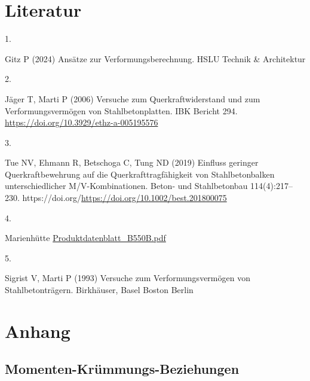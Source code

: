\documentclass[
  11pt,
  letterpaper,
]{scrreprt}
\newlength{\cslhangindent}
\newlength{\csllabelwidth}
\newenvironment{CSLReferences}[2] %
 {\begin{list}{}{%
  \setlength{\itemindent}{0pt}
  \setlength{\leftmargin}{0pt}
  \setlength{\parsep}{0pt}
  \ifodd #1
   \setlength{\leftmargin}{\cslhangindent}
   \setlength{\itemindent}{-1\cslhangindent}
  \fi
  \setlength{\itemsep}{#2\baselineskip}}}
 {\end{list}}
\newcommand{\CSLLeftMargin}[1]{\parbox[t]{\csllabelwidth}{\strut#1\strut}}
\newcommand{\CSLRightInline}[1]{\parbox[t]{\linewidth - \csllabelwidth}{\strut#1\strut}}
\begin{document}
\chapter*{Literatur}\label{literatur}


\label{refs}
\begin{CSLReferences}{0}{1}
\CSLLeftMargin{1. }%
\CSLRightInline{Gitz P (2024) Ansätze zur {Verformungsberechnung}. HSLU
Technik \& Architektur}

\CSLLeftMargin{2. }%
\CSLRightInline{Jäger T, Marti P (2006) Versuche zum
{Querkraftwiderstand} und zum {Verformungsvermögen} von
{Stahlbetonplatten}. IBK Bericht 294.
\url{https://doi.org/10.3929/ethz-a-005195576}}

\CSLLeftMargin{3. }%
\CSLRightInline{Tue NV, Ehmann R, Betschoga C, Tung ND (2019) Einfluss
geringer {Querkraftbewehrung} auf die {Querkrafttragfähigkeit} von
{Stahlbetonbalken} unterschiedlicher {M}/{V}-{Kombinationen}. Beton- und
Stahlbetonbau 114(4):217--230.
https://doi.org/\url{https://doi.org/10.1002/best.201800075}}

\CSLLeftMargin{4. }%
\CSLRightInline{Marienhütte
\href{https://www.marienhuette.at/wp-content/uploads/Produktdatenblatt-B550B.pdf}{Produktdatenblatt\_B550B.pdf}}

\CSLLeftMargin{5. }%
\CSLRightInline{Sigrist V, Marti P (1993) Versuche zum
{Verformungsvermögen} von {Stahlbetonträgern}. Birkhäuser, Basel Boston
Berlin}

\end{CSLReferences}

\cleardoublepage
{}
{}
\appendix

\chapter{Anhang}\label{anhang}

\section{Momenten-Krümmungs-Beziehungen}\label{momenten-kruxfcmmungs-beziehungen}
\end{document}
